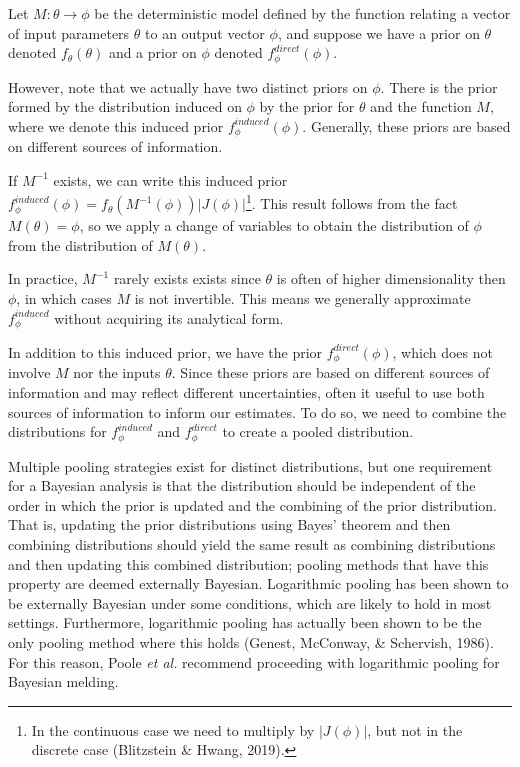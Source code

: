 \documentclass[12pt,twoside]{smiththesis}
\begin{document}
Let \(M: \theta \to \phi\) be the deterministic model defined by the function relating a vector of input parameters \(\theta\) to an output vector \(\phi\), and suppose we have a prior on \(\theta\) denoted \(f_\theta(\theta)\) and a prior on \(\phi\) denoted \(f_\phi^{direct}(\phi)\).

However, note that we actually have two distinct priors on \(\phi\). There is the prior formed by the distribution induced on \(\phi\) by the prior for \(\theta\) and the function \(M\), where we denote this induced prior \(f_\phi^{induced}(\phi)\). Generally, these priors are based on different sources of information.

If \(M^{-1}\) exists, we can write this induced prior \(f_\phi^{induced}(\phi) = f_\theta(M^{-1}(\phi)) |J(\phi)|\)\footnote{In the continuous case we need to multiply by \(|J(\phi)|\), but not in the discrete case (Blitzstein \& Hwang, 2019).}. This result follows from the fact \(M(\theta) = \phi\), so we apply a change of variables to obtain the distribution of \(\phi\) from the distribution of \(M(\theta)\).

In practice, \(M^{-1}\) rarely exists exists since \(\theta\) is often of higher dimensionality then \(\phi\), in which cases \(M\) is not invertible. This means we generally approximate \(f_\phi^{induced}\) without acquiring its analytical form.

In addition to this induced prior, we have the prior \(f_\phi^{direct}(\phi)\), which does not involve \(M\) nor the inputs \(\theta\). Since these priors are based on different sources of information and may reflect different uncertainties, often it useful to use both sources of information to inform our estimates. To do so, we need to combine the distributions for \(f_\phi^{induced}\) and \(f_\phi^{direct}\) to create a pooled distribution.

Multiple pooling strategies exist for distinct distributions, but one requirement for a Bayesian analysis is that the distribution should be independent of the order in which the prior is updated and the combining of the prior distribution. That is, updating the prior distributions using Bayes' theorem and then combining distributions should yield the same result as combining distributions and then updating this combined distribution; pooling methods that have this property are deemed externally Bayesian. Logarithmic pooling has been shown to be externally Bayesian under some conditions, which are likely to hold in most settings. Furthermore, logarithmic pooling has actually been shown to be the only pooling method where this holds (Genest, McConway, \& Schervish, 1986). For this reason, Poole \emph{et al.} recommend proceeding with logarithmic pooling for Bayesian melding.
\end{document}
